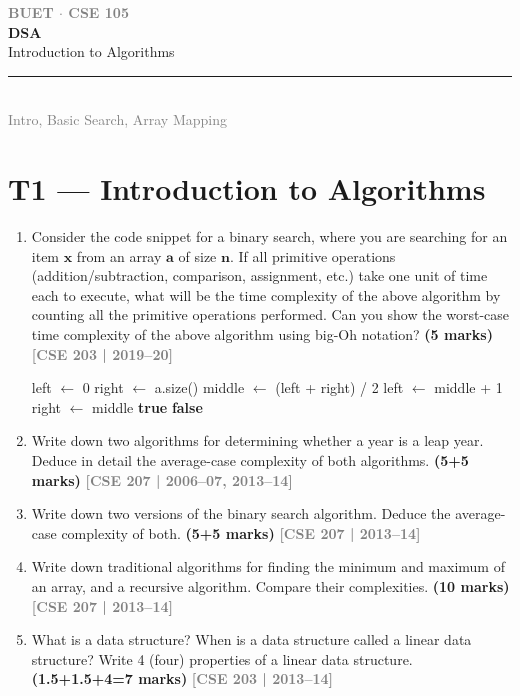 \documentclass[12pt,a3paper]{article}
\newcommand{\yr}[1]{\hfill\textcolor{gray}{\small\textbf{[#1]}}}
\newcommand{\mk}[1]{\textcolor{orange!70!black}{\small\textbf{(#1 marks)}}}
\newcommand{\secdivider}[4]{%
  \newpage\thispagestyle{empty}%
  \vspace*{\fill}%
  \begin{tcolorbox}[enhanced,colback=#4!7,colframe=#3,boxrule=1.5pt,arc=8pt,
    left=20pt,right=20pt,top=22pt,bottom=22pt,
    shadow={3pt}{-3pt}{0pt}{black!15}]
    \centering
    {\large\textcolor{gray}{\textbf{BUET $\cdot$ CSE 105}}}\\[8pt]
    {\fontsize{26}{32}\selectfont\bfseries\textcolor{#3}{DSA}}\\[6pt]
    {\fontsize{15}{19}\selectfont\textcolor{dgray}{#1}}\\[12pt]
    \textcolor{#3!60}{\rule{0.5\textwidth}{0.5pt}}\\[6pt]
    {\small\textcolor{gray}{#2}}
  \end{tcolorbox}%
  \vspace*{\fill}\newpage%
}
\begin{document}
\newpage

\secdivider{Introduction to Algorithms}{Intro, Basic Search, Array Mapping}{cA}{cA}
\label{sec:T1}
\section{T1 --- Introduction to Algorithms}

\begin{enumerate}

  
\item Consider the code snippet for a binary search, where you are searching for
an item $\mathbf{x}$ from an array $\mathbf{a}$ of size $\mathbf{n}$. If all
primitive operations (addition/subtraction, comparison, assignment, etc.) take
one unit of time each to execute, what will be the time complexity of the above
algorithm by counting all the primitive operations performed. Can you show the
worst-case time complexity of the above algorithm using big-Oh notation? \mk{5}
\yr{CSE 203 | 2019--20}

\begin{algorithm}[H]
\caption{\textsc{BinarySearch}($a, x$)}
\begin{algorithmic}[1]
\State left $\gets$ 0
\State right $\gets$ a.size()
  \State middle $\gets$ (left + right) / 2
    \State left $\gets$ middle + 1
  \Else
    \State right $\gets$ middle
  \EndIf
\EndWhile
{}
  \State \Return \textbf{true}
\Else
  \State \Return \textbf{false}
\EndIf
\end{algorithmic}
\end{algorithm}

\item Write down two algorithms for determining whether a year is a leap year. Deduce in detail the average-case complexity of both algorithms. \mk{5+5}
\yr{CSE 207 | 2006--07, 2013--14}

\item Write down two versions of the binary search algorithm. Deduce the average-case complexity of both. \mk{5+5}
\yr{CSE 207 | 2013--14}

\item Write down traditional algorithms for finding the minimum and maximum of an array, and a recursive algorithm. Compare their complexities. \mk{10}
\yr{CSE 207 | 2013--14}

\item What is a data structure? When is a data structure called a linear data structure? Write 4 (four) properties of a linear data structure. \mk{1.5+1.5+4=7}
\yr{CSE 203 | 2013--14}


\end{enumerate}
\end{document}
